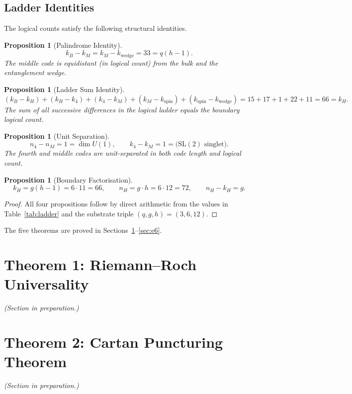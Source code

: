 \documentclass[12pt]{article}
\newtheorem{proposition}[theorem]{Proposition}
\begin{document}
\subsection{Ladder Identities}

The logical counts satisfy the following structural identities.

\begin{proposition}[Palindrome Identity]
\[
k_B - k_M = k_M - k_\mathrm{wedge} = 33 = q(h-1).
\]
The middle code is equidistant (in logical count) from the bulk and the entanglement wedge.
\end{proposition}

\begin{proposition}[Ladder Sum Identity]
\[
(k_B - k_H) + (k_H - k_4) + (k_4 - k_M) + (k_M - k_\mathrm{spin}) + (k_\mathrm{spin} - k_\mathrm{wedge})
= 15 + 17 + 1 + 22 + 11 = 66 = k_H.
\]
The sum of all successive differences in the logical ladder equals the boundary logical count.
\end{proposition}

\begin{proposition}[Unit Separation]
\[
n_4 - n_M = 1 = \dim U(1), \qquad k_4 - k_M = 1 = \text{(SL}(2)\text{ singlet)}.
\]
The fourth and middle codes are unit-separated in both code length and logical count.
\end{proposition}

\begin{proposition}[Boundary Factorisation]
\[
k_H = g(h-1) = 6 \cdot 11 = 66, \qquad n_H = g \cdot h = 6 \cdot 12 = 72,
\qquad n_H - k_H = g.
\]
\end{proposition}

\begin{proof}
All four propositions follow by direct arithmetic from the values in
Table~\ref{tab:ladder} and the substrate triple $(q,g,h)=(3,6,12)$.
\end{proof}

\medskip
The five theorems are proved in Sections~\ref{sec:rr}--\ref{sec:e6}.


\section{Theorem 1: Riemann--Roch Universality}\label{sec:rr}
\emph{(Section in preparation.)}

\section{Theorem 2: Cartan Puncturing Theorem}\label{sec:cartan}
\emph{(Section in preparation.)}
\end{document}
